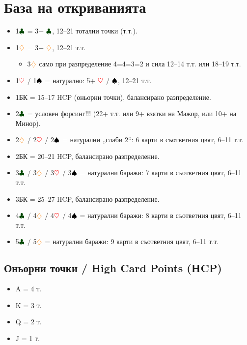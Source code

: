 \documentclass[10pt,a5paper]{extarticle}
\newcommand{\Rheart}{\textcolor{red}{\heartsuit}}
\newcommand{\Rdiamond}{\textcolor{orange}{\diamondsuit}}
\newcommand{\Bspade}{\textcolor{black}{\spadesuit}}
\newcommand{\Bclub}{\textcolor{darkgreen}{\clubsuit}}
\begin{document}
\vspace{1em}


\newpage
\section{База на откриванията}

\begin{itemize}
  \item[] 1$\Bclub$ = 3+ $\Bclub$, 12–21 тотални точки (т.т.).
  \item[] 1$\Rdiamond$ = 3+ $\Rdiamond$, 12–21 т.т. 
    \begin{itemize}
      \item[] 3$\Rdiamond$ само при разпределение 4=4=3=2 и сила 12–14 т.т. или 18–19 т.т.
    \end{itemize}
  \item[] 1$\Rheart$ / 1$\Bspade$ = натурално: 5+ $\Rheart$ / $\Bspade$, 12–21 т.т.
  \item[] 1БК = 15–17 HCP (оньорни точки), балансирано разпределение.
  \item[] 2$\Bclub$ = условен форсинг!!! (22+ т.т. или 9+ взятки на Мажор, или 10+ на Минор).
  \item[] 2$\Rdiamond$ / 2$\Rheart$ / 2$\Bspade$ = натурални „слаби 2“: 6 карти в съответния цвят, 6–11 т.т.
  \item[] 2БК = 20–21 HCP, балансирано разпределение.
  \item[] 3$\Bclub$ / 3$\Rdiamond$ / 3$\Rheart$ / 3$\Bspade$ = натурални баражи: 7 карти в съответния цвят, 6–11 т.т.
  \item[] 3БК = 25–27 HCP, балансирано разпределение.
  \item[] 4$\Bclub$ / 4$\Rdiamond$ / 4$\Rheart$ / 4$\Bspade$ = натурални баражи: 8 карти в съответния цвят, 6–11 т.т.
  \item[] 5$\Bclub$ / 5$\Rdiamond$ = натурални баражи: 9 карти в съответния цвят, 6–11 т.т.
\end{itemize}

\subsection*{Оньорни точки / High Card Points (HCP)}
\begin{itemize}
  \item[] A = 4 т.
  \item[] K = 3 т.
  \item[] Q = 2 т.
  \item[] J = 1 т.
\end{itemize}
\end{document}
